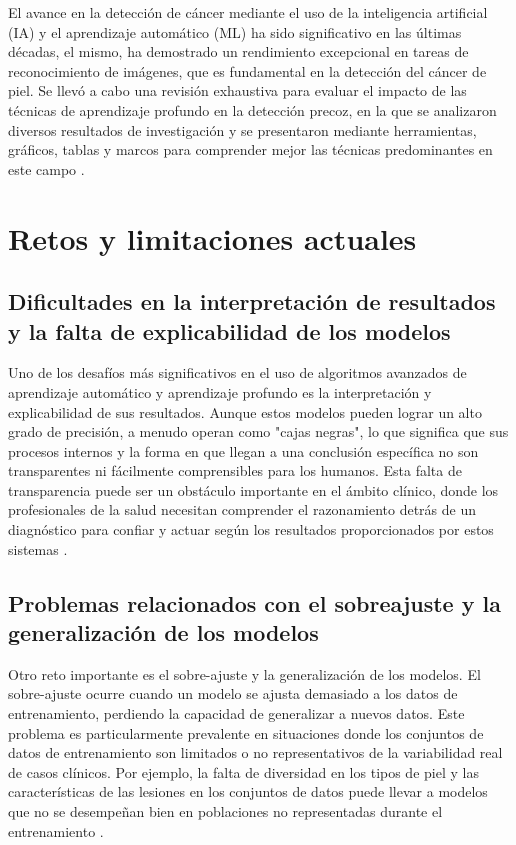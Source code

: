 El avance en la detección de cáncer mediante el uso de la inteligencia artificial (IA) y el aprendizaje automático (ML) ha sido significativo en 
las últimas décadas, el mismo, ha demostrado un rendimiento excepcional en tareas de reconocimiento de imágenes, que es fundamental en la detección 
del cáncer de piel. Se llevó a cabo una revisión exhaustiva para evaluar el impacto de las técnicas de aprendizaje profundo en la detección precoz, 
en la que se analizaron diversos resultados de investigación y se presentaron mediante herramientas, gráficos, tablas y marcos para comprender mejor 
las técnicas predominantes en este campo .


\section{Retos y limitaciones actuales}

\subsection{Dificultades en la interpretación de resultados y la falta de explicabilidad de los modelos}

Uno de los desafíos más significativos en el uso de algoritmos avanzados de aprendizaje automático y aprendizaje profundo es la interpretación y explicabilidad de sus resultados. Aunque estos modelos pueden lograr un alto grado de precisión, a menudo operan como "cajas negras", lo que significa que sus procesos internos y la forma en que llegan a una conclusión específica no son transparentes ni fácilmente comprensibles para los humanos. Esta falta de transparencia puede ser un obstáculo importante en el ámbito clínico, donde los profesionales de la salud necesitan comprender el razonamiento detrás de un diagnóstico para confiar y actuar según los resultados proporcionados por estos sistemas .


\subsection{Problemas relacionados con el sobreajuste y la generalización de los modelos}
Otro reto importante es el sobre-ajuste y la generalización de los modelos. El sobre-ajuste ocurre cuando un modelo se ajusta demasiado a los datos de entrenamiento, perdiendo la capacidad de generalizar a nuevos datos. Este problema es particularmente prevalente en situaciones donde los conjuntos de datos de entrenamiento son limitados o no representativos de la variabilidad real de casos clínicos. Por ejemplo, la falta de diversidad en los tipos de piel y las características de las lesiones en los conjuntos de datos puede llevar a modelos que no se desempeñan bien en poblaciones no representadas durante el entrenamiento .

